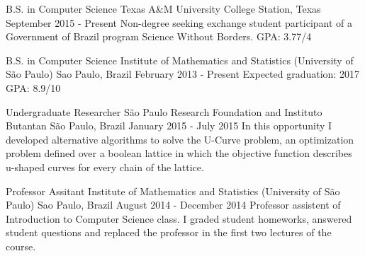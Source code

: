 \documentclass[11pt, a4paper]{awesome-cv-res}
\begin{document}
\makecvheader
\makecvfooter
  {}
  {}
  {\thepage}



\begin{cventries}
\cventry
{B.S. in Computer Science}
{Texas A\&M University}
{College Station, Texas}
{September 2015 - Present}
{Non-degree seeking exchange student participant of a Government of Brazil program Science Without Borders. \newline GPA: 3.77/4}
\newline 
\newline

\cventry
{B.S. in Computer Science} %
{Institute of Mathematics and Statistics (University of São Paulo)} %
{Sao Paulo, Brazil} %
{February 2013 - Present} %
{Expected graduation: 2017 \newline GPA: 8.9/10}
\end{cventries}

\begin{cventries}
\cventry
{Undergraduate Researcher}
{São Paulo Research Foundation and Instituto Butantan}
{São Paulo, Brazil}
{January 2015 - July 2015}
{In this opportunity I developed alternative algorithms to solve the U-Curve problem, an optimization problem defined over a boolean lattice in which the objective function describes u-shaped curves for every chain of the lattice.}
\newline 
\newline

\cventry
{Professor Assitant} 
{Institute of Mathematics and Statistics (University of São Paulo)} 
{Sao Paulo, Brazil}
{August 2014 - December 2014}
{Professor assistent of Introduction to Computer Science class. I graded student homeworks, answered student questions and replaced the professor in the first two lectures of the course.}
\end{cventries}
\end{document}
